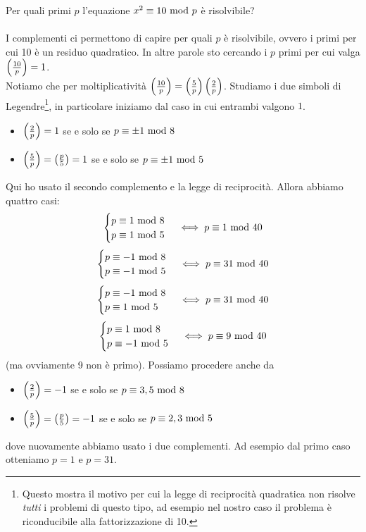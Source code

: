 \begin{esempio}
	Per quali primi $p$ l'equazione $x^2\equiv10\ \mathrm{mod}\ p$ è risolvibile? \\ \\ 
	I complementi ci permettono di capire per quali $p$ è risolvibile, ovvero i primi per cui 10 è un residuo quadratico. In altre parole sto cercando i $p$ primi per cui valga $\left(\frac{10}{p}\right)=1$. \\ Notiamo che per moltiplicatività $\left(\frac{10}{p}\right)=\left(\frac{5}{p}\right)\left(\frac{2}{p}\right)$. Studiamo i due simboli di Legendre\footnote{Questo mostra il motivo per cui la legge di reciprocità quadratica non risolve \textit{tutti} i problemi di questo tipo, ad esempio nel nostro caso il problema è riconducibile alla fattorizzazione di 10.}, in particolare iniziamo dal caso in cui entrambi valgono $1$.
	\begin{itemize}
		\item $\left(\frac{2}{p}\right)=1$ se e solo se $p\equiv\pm1\ \mathrm{mod}\ 8$
		\item $\left(\frac{5}{p}\right)=\left(\frac{p}{5}\right)=1$ se e solo se $p\equiv\pm1\ \mathrm{mod}\ 5$
	\end{itemize}
	Qui ho usato il secondo complemento e la legge di reciprocità. Allora abbiamo quattro casi:
	\begin{equation*}
	\begin{cases}
	p\equiv1\ \mathrm{mod}\ 8\\p\equiv1\ \mathrm{mod}\ 5
	\end{cases}
	\iff p\equiv1\ \mathrm{mod}\ 40
	\end{equation*}
	\begin{equation*}
	\begin{cases}
	p\equiv-1\ \mathrm{mod}\ 8\\p\equiv-1\ \mathrm{mod}\ 5
	\end{cases}
	\iff p\equiv31\ \mathrm{mod}\ 40
	\end{equation*}
	\begin{equation*}
	\begin{cases}
	p\equiv-1\ \mathrm{mod}\ 8\\p\equiv1\ \mathrm{mod}\ 5
	\end{cases}
	\iff p\equiv31\ \mathrm{mod}\ 40
	\end{equation*}
	\begin{equation*}
	\begin{cases}
	p\equiv1\ \mathrm{mod}\ 8\\p\equiv-1\ \mathrm{mod}\ 5
	\end{cases}
	\iff p\equiv9\ \mathrm{mod}\ 40
	\end{equation*}
	(ma ovviamente 9 non è primo). Possiamo procedere anche da
	\begin{itemize}
		\item $\left(\frac{2}{p}\right)=-1$ se e solo se $p\equiv3,5\ \mathrm{mod}\ 8$
		\item $\left(\frac{5}{p}\right)=\left(\frac{p}{5}\right)=-1$ se e solo se $p\equiv2,3\ \mathrm{mod}\ 5$
	\end{itemize}
	dove nuovamente abbiamo usato i due complementi.
	Ad esempio dal primo caso otteniamo $p=1$ e $p=31$.
\end{esempio}
